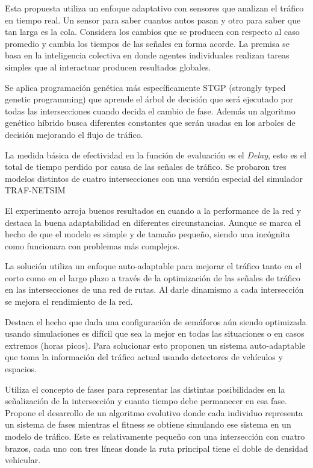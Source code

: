 \begin{itemize}
	
	\begin{item}
		Esta propuesta utiliza un enfoque adaptativo con sensores que analizan el tráfico en tiempo real. Un sensor para saber cuantos autos pasan y otro para saber que tan larga es la cola. Considera los cambios que se producen con respecto al caso promedio y cambia los tiempos de las señales en forma acorde.
		La premisa se basa en la inteligencia colectiva en donde agentes individuales realizan tareas simples que al interactuar producen resultados globales.
		
		Se aplica programación genética más específicamente STGP (strongly typed genetic programming) \citep{Montana1995} que aprende el árbol de decisión que será ejecutado por todas las intersecciones cuando decida el cambio de fase. Además un algoritmo genético híbrido busca diferentes constantes que serán usadas en los arboles de decisión mejorando el flujo de tráfico.
		
		La medida básica de efectividad en la función de evaluación es el \emph{Delay}, esto es el total de tiempo perdido por causa de las señales de tráfico. Se probaron tres modelos distintos de cuatro intersecciones con una versión especial del simulador  TRAF-NETSIM \citep{TRAF-NETSIM}
		
		El experimento arroja buenos resultados en cuando a la performance de la red y destaca la buena adaptabilidad en diferentes circunstancias. Aunque se marca el hecho de que el modelo es simple y de tamaño pequeño, siendo una incógnita como funcionara con problemas más complejos.
		
	\end{item}	
	
	
	\begin{item}
		\bibentry{Vogel2000}
		
		La solución utiliza un enfoque auto-adaptable para mejorar el tráfico tanto en el corto como en el largo plazo a través de la optimización de las señales de tráfico en las intersecciones de una red de rutas. Al darle dinamismo a cada intersección se mejora el rendimiento de la red.
		
		Destaca el hecho que dada una configuración de semáforos aún siendo optimizada usando simulaciones es difícil que sea la mejor en todas las situaciones o en casos extremos (horas picos). Para solucionar esto proponen un sistema auto-adaptable que toma la información del tráfico actual usando detectores de vehículos y espacios.
		
		Utiliza el concepto de fases para representar las distintas posibilidades en la señalización de la intersección y cuanto tiempo debe permanecer en esa fase. 
		Propone el desarrollo de un algoritmo evolutivo donde cada individuo representa un sistema de fases mientras el fitness se obtiene simulando ese sistema en un modelo de tráfico. Este es relativamente pequeño con una intersección con cuatro brazos, cada uno con tres líneas donde la ruta principal tiene el doble de densidad vehicular. 
		

\end{item}
\end{itemize}
